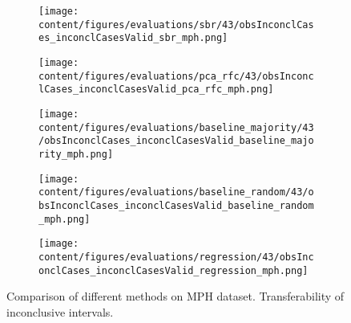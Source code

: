 \begin{figure}[ht]
  \begin{subfigure}{0.5\textwidth}
    \centering
    \texttt{[image: content/figures/evaluations/sbr/43/obsInconclCases\_inconclCasesValid\_sbr\_mph.png]}
  \end{subfigure}
  \hfill
  \begin{subfigure}{0.5\textwidth}
    \centering
    \texttt{[image: content/figures/evaluations/pca\_rfc/43/obsInconclCases\_inconclCasesValid\_pca\_rfc\_mph.png]}
  \end{subfigure}
  \hfill
  \begin{subfigure}{0.5\textwidth}
    \centering
    \texttt{[image: content/figures/evaluations/baseline\_majority/43/obsInconclCases\_inconclCasesValid\_baseline\_majority\_mph.png]}
  \end{subfigure}
  \hfill
  \begin{subfigure}{0.5\textwidth}
    \centering
    \texttt{[image: content/figures/evaluations/baseline\_random/43/obsInconclCases\_inconclCasesValid\_baseline\_random\_mph.png]}
  \end{subfigure}
  \hfill
  \begin{subfigure}{0.5\textwidth}
    \centering
    \texttt{[image: content/figures/evaluations/regression/43/obsInconclCases\_inconclCasesValid\_regression\_mph.png]}
  \end{subfigure}

  \caption{Comparison of different methods on MPH dataset. Transferability of inconclusive intervals.}
  \label{fig:test_interval_match_mph}
\end{figure}




